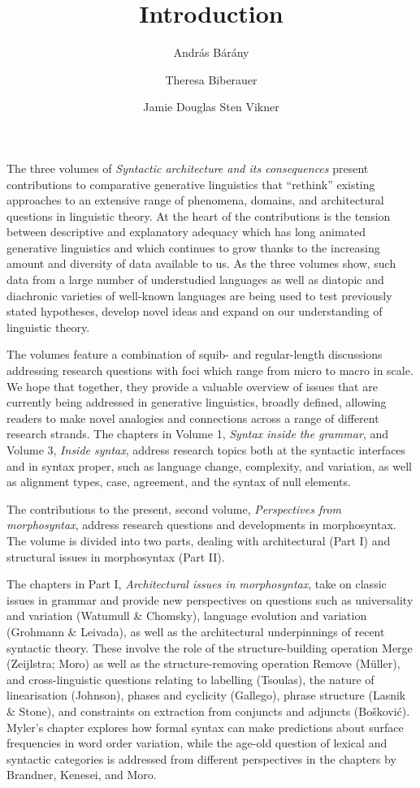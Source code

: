\documentclass[output=paper]{langsci/langscibook}
\author{András Bárány\affiliation{Bielefeld University}\and
        Theresa Biberauer\affiliation{University of Cambridge, Stellenbosch
        University, University of the West Cape}\and
        Jamie Douglas\affiliation{University of Cambridge}\lastand
        Sten Vikner\affiliation{Aarhus University}}
\title{Introduction}
\begin{document}
\maketitle

\noindent The three volumes of \emph{Syntactic architecture and its
consequences} present contributions to comparative generative linguistics that
\enquote{rethink} existing approaches to an extensive range of phenomena,
domains, and architectural questions in linguistic theory. At the heart of the
contributions is the tension between descriptive and explanatory adequacy which
has long animated generative linguistics and which continues to grow thanks to
the increasing amount and diversity of data available to us. As the three
volumes show, such data from a large number of understudied languages as well
as diatopic and diachronic varieties of well-known languages are being used to
test previously stated hypotheses, develop novel ideas and expand on our
understanding of linguistic theory.

The volumes feature a combination of squib- and regular-length discussions
addressing research questions with foci which range from micro to macro in
scale. We hope that together, they provide a valuable overview of issues that
are currently being addressed in generative linguistics, broadly defined,
allowing readers to make novel analogies and connections across a range of
different research strands. The chapters in Volume 1, \emph{Syntax inside the
grammar}, and Volume 3, \emph{Inside syntax}, address research topics both at
the syntactic interfaces and in syntax proper, such as language change,
complexity, and variation, as well as alignment types, case, agreement, and the
syntax of null elements.

The contributions to the present, second volume, \emph{Perspectives from
morphosyntax}, address research questions and developments in morphosyntax.
The volume is divided into two parts, dealing with architectural (Part I) and
structural issues in morphosyntax (Part II).

The chapters in Part I, \emph{Architectural issues in morphosyntax}, take on
classic issues in grammar and provide new perspectives on questions such as
universality and variation (Watumull \& Chomsky), language evolution and
variation (Grohmann \& Leivada), as well as the architectural underpinnings of
recent syntactic theory. These involve the role of the structure-building
operation Merge (Zeijlstra; Moro) as well as the structure-removing operation
Remove (Müller), and cross-linguistic questions relating to labelling
(Tsoulas), the nature of linearisation (Johnson), phases and cyclicity
(Gallego), phrase structure (Lasnik \& Stone), and constraints on extraction
from conjuncts and adjuncts (Bošković). Myler’s chapter explores how formal
syntax can make predictions about surface frequencies in word order variation,
while the age-old question of lexical and syntactic categories is addressed
from different perspectives in the chapters by Brandner, Kenesei, and Moro.
\end{document}
